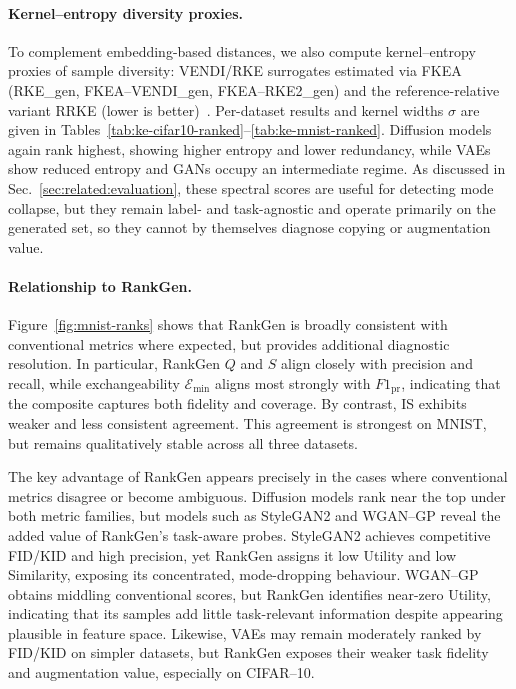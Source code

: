\paragraph{Kernel--entropy diversity proxies.}
To complement embedding-based distances, we also compute kernel--entropy
proxies of sample diversity: VENDI/RKE surrogates estimated via FKEA
(RKE\_gen, FKEA--VENDI\_gen, FKEA--RKE2\_gen) and the reference-relative
variant RRKE (lower is better)~\citep{friedman2023vendi,pasarkar2024cousins,jalali2024fkea,luo2024converge}.
Per-dataset results and kernel widths $\sigma$ are given in
Tables~\ref{tab:ke-cifar10-ranked}--\ref{tab:ke-mnist-ranked}. Diffusion models
again rank highest, showing higher entropy and lower redundancy, while VAEs
show reduced entropy and GANs occupy an intermediate regime. As discussed in
Sec.~\ref{sec:related:evaluation}, these spectral scores are useful for
detecting mode collapse, but they remain label- and task-agnostic and operate
primarily on the generated set, so they cannot by themselves diagnose copying
or augmentation value.

\paragraph{Relationship to RankGen.}
Figure~\ref{fig:mnist-ranks} shows that RankGen is broadly consistent with
conventional metrics where expected, but provides additional diagnostic
resolution. In particular, RankGen $Q$ and $S$ align closely with precision and
recall, while exchangeability $\mathcal{E}_{\min}$ aligns most strongly with
$F1_{\text{pr}}$, indicating that the composite captures both fidelity and
coverage. By contrast, IS exhibits weaker and less consistent agreement. This
agreement is strongest on MNIST, but remains qualitatively stable across all
three datasets.

The key advantage of RankGen appears precisely in the cases where conventional
metrics disagree or become ambiguous. Diffusion models rank near the top under
both metric families, but models such as StyleGAN2 and WGAN--GP reveal the
added value of RankGen’s task-aware probes. StyleGAN2 achieves competitive
FID/KID and high precision, yet RankGen assigns it low Utility and low
Similarity, exposing its concentrated, mode-dropping behaviour. WGAN--GP
obtains middling conventional scores, but RankGen identifies near-zero Utility,
indicating that its samples add little task-relevant information despite
appearing plausible in feature space. Likewise, VAEs may remain moderately
ranked by FID/KID on simpler datasets, but RankGen exposes their weaker task
fidelity and augmentation value, especially on CIFAR--10.

